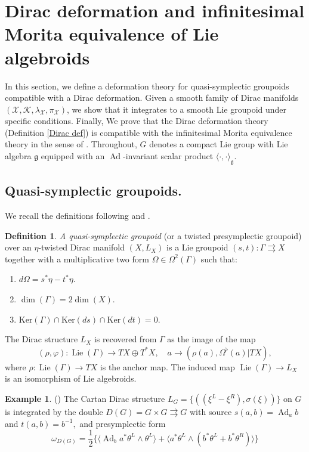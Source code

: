 \documentclass[reqno]{amsart}
\theoremstyle{plain}
\theoremstyle{definition}
\newtheorem{Def}[Thm]{Definition}
\newtheorem{Exp}[Thm]{Example}
\newcommand{\g}{\mathfrak{g}}
\newcommand{\too}{\longrightarrow}
\newcommand{\Ad}{\operatorname{Ad}}
\newcommand{\X}{\mathcal{X}}
\newcommand{\Ker}{\text{Ker}}
\newcommand{\K}{\mathcal{K}}
\newcommand{\Lie}{\operatorname{Lie}}
\begin{document}
\section{Dirac deformation and infinitesimal Morita equivalence of Lie algebroids} \label{section 6}

In this section, we define a deformation theory for quasi-symplectic groupoids compatible with a Dirac deformation. Given a smooth family of Dirac manifolds $(\X,\K,\lambda_{\X},\pi_\X)$, we show that it integrates to a smooth Lie groupoid under specific conditions. Finally,
We prove that the Dirac deformation theory (Definition \ref{Dirac def}) is compatible with the infinitesimal Morita equivalence theory in the sense of \cite{xu2004momentum}. Throughout, $G$ denotes a compact Lie group with Lie algebra $\g$ equipped with an $\Ad$-invariant scalar product $\langle \cdot,\cdot \rangle_{\g}.$

\subsection{Quasi-symplectic groupoids.} We recall the definitions following \cite[]{bualibanu2026reduction} and \cite{xu2004momentum,bursztyn2004integration}.

\begin{Def}
    \textit{A quasi-symplectic groupoid} (or a twisted presymplectic groupoid) over an $\eta$-twisted Dirac manifold $(X,L_X)$ is a Lie groupoid $(s,t): \Gamma \rightrightarrows X$ together with a multiplicative two form $\Omega \in \Omega^{2}(\Gamma)$ such that: \begin{enumerate}
        \item $d\Omega = s^{*}\eta - t^{*}\eta.$
        \item $\dim(\Gamma) = 2\dim(X).$
        \item $\Ker (\Gamma) \cap \Ker (ds) \cap \Ker (dt) = 0.$
    \end{enumerate}
    The Dirac structure $L_X$ is recovered from $\Gamma$ as the image of the map \[
    (\rho,\varphi): \Lie(\Gamma)\too TX \oplus T^{*}X, \quad a \too (\rho(a),\Omega^{\flat}(a)|TX),
    \]
    where $\rho: \Lie(\Gamma) \too TX$ is the anchor map. The induced map $\Lie(\Gamma)\too L_X$ is an isomorphism of Lie algebroids.
\end{Def}



\begin{Exp}(\cite[]{bualibanu2026reduction})
The Cartan Dirac structure $L_G = \{((\xi^{L} - \xi^{R}),\sigma(\xi))\}$ on $G$ is integrated by the double $D(G) = G\times G \rightrightarrows G$ with source $s(a,b) = \Ad_{a}b$ and $t(a,b) = b^{-1},$ and presymplectic form \[
\omega_{D(G)} = \dfrac{1}{2} \Big\{ \langle \Ad_{b}a^{*}\theta^{L} \wedge \theta^{L} \rangle + \langle a^{*}\theta^{L} \wedge (b^{*}\theta^{L} + b^{*}\theta^{R}) \rangle \Big\}
\]
\end{Exp}
\end{document}
